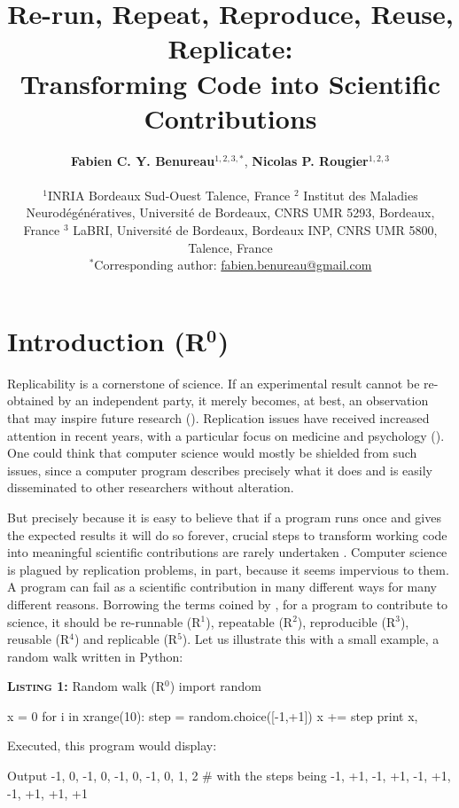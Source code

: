 \documentclass[a4paper,11pt]{article}
\title{Re-run, Repeat, Reproduce, Reuse, Replicate:\\Transforming Code into Scientific Contributions}
\author{
  \textbf{Fabien C. Y. Benureau}$^{1,2,3,*}$,
  \textbf{Nicolas P. Rougier}$^{1,2,3}$\\ \begin{minipage}{\textwidth}
    \begin{center}
      \vspace{2mm}
      $^{1}$INRIA Bordeaux Sud-Ouest Talence, France $^{2}$ Institut des
      Maladies Neurodégénératives, Université de Bordeaux, CNRS UMR 5293,
      Bordeaux, France $^{3}$ LaBRI, Université de Bordeaux, Bordeaux INP, CNRS
      UMR 5800, Talence, France\\
      \vspace{2mm}
      $^{*}$Corresponding author:
      \href{mailto:fabien.benureau@gmail.com}{fabien.benureau@gmail.com}
    \end{center}
  \end{minipage}
}
\date{}
\begin{document}
\maketitle
\section*{Introduction (R$^{\mathbf 0}$)}

Replicability is a cornerstone of science.  If an experimental result cannot be
re-obtained by an independent party, it merely becomes, at best, an observation
that may inspire future research (\cite{Mesirov:2010,osc:2015}). Replication
issues have received increased attention in recent years, with a particular focus on medicine and psychology (\cite{Iqbal:2016}).  One could think
that computer science would mostly be shielded from such issues, since a
computer program describes precisely what it does and is easily
disseminated to other researchers without alteration.

But precisely because it is easy to believe that if a program runs once and
gives the expected results it will do so forever, crucial steps to transform
working code into meaningful scientific contributions are rarely undertaken
\citep{Sandve:2013,Schwab:2000}. Computer science is plagued by replication
problems, in part, because it seems impervious to them. A program can
fail as a scientific contribution in many different ways for many different
reasons. Borrowing the terms coined by \citeauthor{Goble:2016}
\citep{Goble:2016}, for a program to contribute to science, it should be
re-runnable (R$^1$), repeatable (R$^2$), reproducible (R$^3$),
reusable (R$^4$) and replicable (R$^5$). Let us illustrate this with a small
example, a random walk written in Python:\\

\noindent \begin{minipage}[c]{\linewidth}
\begin{code}{\textbf{\textsc{Listing 1:}} Random walk (R$^0$)}
import random

x = 0
for i in xrange(10):
    step = random.choice([-1,+1])
    x += step
    print x,
\end{code}
\end{minipage}

Executed, this program would display:
\begin{code}{Output}
-1, 0, -1, 0, -1, 0, -1, 0, 1, 2 # with the steps being -1, +1, -1, +1, -1, +1, -1, +1, +1, +1
\end{code}
\end{document}
